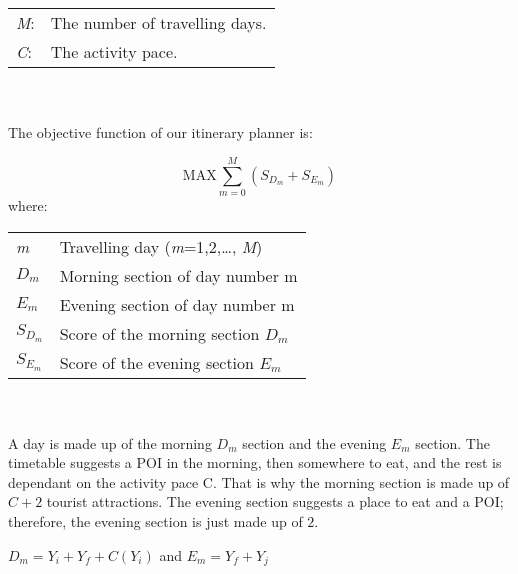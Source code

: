 \setlength{\tabcolsep}{20pt}

\begin{tabular}{l l}

\textit{M}:  &  The number of travelling days. \\
\textit{C}: & The activity pace.\\  
\end{tabular}
\\
\\
The objective function of our itinerary planner is:

\[ \text{MAX}  \sum_{m=0}^{M} ( S_{{D_m}} + S_{{E_m}}) \]
where:
\\
\begin{tabular}{l l}
\textit{m} & Travelling day (\textit{m}=1,2,\ldots, \textit{M}) \\ 
\textit{$D_m$} & Morning section of day number m \\  
\textit{$E_m$} & Evening section of day number m \\  
\textit{$S_{D_m}$} & Score of the morning section $D_m$ \\  
\textit{$S_{E_m}$} & Score of the evening section $E_m$ \\  
\end{tabular}
\\
\\

A day is made up of the morning ${D_m}$ section and
the evening ${E_m}$ section. The timetable suggests a
POI in the morning, then somewhere to eat, and the
rest is dependant on the activity pace C. That is why
the morning section is made up of $C + 2$ tourist
attractions. The evening section suggests a place to
eat and a POI; therefore, the evening section is just
made up of $2$. 

\begin{center}
$D_m = Y_i + Y_f + C ( Y_i)$ and $E_m = Y_f + Y_j $

\end{center}



